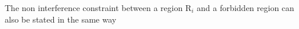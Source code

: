 The non interference constraint between a region R$_i$ and a forbidden region can also be stated in the same way

\begin{comment}
 
\subsubsection*{\textit {Interference between two slots}}


\hfill \break
Variables denoting the relationship between two slots 

For two slots S$_i$ and S$_k$ 
\begin{itemize}
\item $\gamma_{ik}$ $\in$ [0,1] is a binary variable used to identify whether S$_i$ is found on the left or on the right of S$_k$\\
$\gamma_{ik}$ = 1 if x$_i$ $\leq$ x$_k$ [i.e. S$_i$ is on the left of S$_k$]
\end{itemize}

Two slots S$_i$ and S$_k$ are said to be non interfering under the following conditions
\begin{algorithmic}
\IF{x$_i$ $\leq$ x$_k$ and y$_i$ $\leq$ y$_k$}
	\STATE x$_i$ + w$_i$ $<$ x$_k$ or y$_i$ + h$_i$ $<$ y$_k$
\ELSIF {x$_i$ $\geq$ x$_k$ and y$_i$ $\geq$ y$_k$}
	\STATE x$_i$ + w$_k$ $<$ x$_i$ or y$_k$ + h$_k$ $<$ y$_i$
\ELSIF {x$_1$ $<$ x$_k$ and y$_i$ $>$ y$_k$}
	\STATE x$_i$ + w$_i$ $<$ x$_k$ or y$_k$ + h$_k$ $<$ y$_i$
\ELSE
	\STATE x$_k$ + w$_k$ $<$ x$_k$ or y$_i$ + h$_i$ $<$ y$_k$
\ENDIF
\end{algorithmic}

This above condition can be encoded into a set of MILP constraints as follows \\
\begin{constraint} S$_i$ $\in$ N and S$_k$ $\in$ N
\begin{equation} 
\begin{split}
\delta_{ik} & \geq \gamma_{ik} + \theta_{ik} + \Gamma_{ik} + \Omega_{ik} - 3 \\
\delta_{ik} & \geq (1 - \gamma_{ik}) + \theta_{ik} + \eta_{ik} + \Omega_{ik} - 3 \\
\delta_{ik} & \geq \gamma_{ik} +(1 - \theta_{ik}) + \Gamma_{ik} + \Psi_{ik} - 3 \\
\delta_{ik} & \geq (1 - \gamma_{ik}) + (1 - \theta_{ik}) + \eta_{ik} + \Psi_{ik} - 3 \\
\delta_{ik} & = 0 \\
\end{split}
\end{equation}
\end{constraint}


\end{comment}

